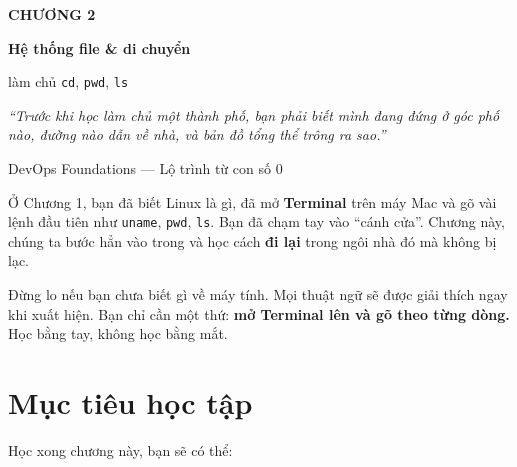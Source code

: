 \documentclass[12pt,a4paper]{article}
\begin{document}
\begin{titlepage}
\centering
\vspace*{3cm}
{\Huge\bfseries\color{checkcolor} CHƯƠNG 2\par}
\vspace{1cm}
{\LARGE\bfseries Hệ thống file \& di chuyển\par}
\vspace{0.5cm}
{\Large làm chủ \texttt{cd}, \texttt{pwd}, \texttt{ls}\par}
\vspace{2cm}
{\large\itshape ``Trước khi học làm chủ một thành phố, bạn phải biết mình đang đứng ở góc phố nào, đường nào dẫn về nhà, và bản đồ tổng thể trông ra sao.''\par}
\vfill
{\large DevOps Foundations — Lộ trình từ con số 0\par}
\vspace{1cm}
\end{titlepage}

\tableofcontents
\newpage

\noindent
Ở Chương 1, bạn đã biết Linux là gì, đã mở \textbf{Terminal} trên máy Mac và gõ vài lệnh đầu tiên như \texttt{uname}, \texttt{pwd}, \texttt{ls}. Bạn đã chạm tay vào ``cánh cửa''. Chương này, chúng ta bước hẳn vào trong và học cách \textbf{đi lại} trong ngôi nhà đó mà không bị lạc.

\vspace{0.4em}
Đừng lo nếu bạn chưa biết gì về máy tính. Mọi thuật ngữ sẽ được giải thích ngay khi xuất hiện. Bạn chỉ cần một thứ: \textbf{mở Terminal lên và gõ theo từng dòng.} Học bằng tay, không học bằng mắt.

\section{Mục tiêu học tập}

Học xong chương này, bạn sẽ có thể:
\end{document}
